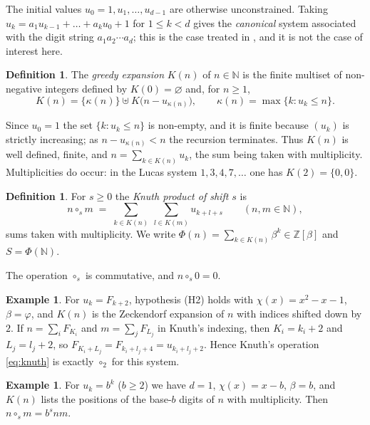 \documentclass[11pt,reqno]{amsart}
\theoremstyle{plain}
\theoremstyle{definition}
\newtheorem{definition}[theorem]{Definition}
\newtheorem{example}[theorem]{Example}
\newcommand{\Z}{\mathbb{Z}}
\newcommand{\N}{\mathbb{N}}
\begin{document}
The initial values $u_{0}=1,u_{1},\dots,u_{d-1}$ are otherwise unconstrained. Taking
$u_{k}=a_{1}u_{k-1}+\dots+a_{k}u_{0}+1$ for $1\le k<d$ gives the \emph{canonical} system associated
with the digit string $a_{1}a_{2}\cdots a_{d}$; this is the case treated in
\cite{Grabner,Messaoudi1,Messaoudi2,AFMP}, and it is not the case of interest here.

\begin{definition}\label{def:greedy}
The \emph{greedy expansion} $K(n)$ of $n\in\N$ is the finite multiset of non-negative integers
defined by $K(0)=\varnothing$ and, for $n\ge1$,
\[
  K(n)=\{\kappa(n)\}\uplus K\bigl(n-u_{\kappa(n)}\bigr),
  \qquad \kappa(n)=\max\{k:u_{k}\le n\}.
\]
\end{definition}

Since $u_{0}=1$ the set $\{k:u_{k}\le n\}$ is non-empty, and it is finite because $(u_{k})$ is
strictly increasing; as $n-u_{\kappa(n)}<n$ the recursion terminates. Thus $K(n)$ is well defined,
finite, and $n=\sum_{k\in K(n)}u_{k}$, the sum being taken with multiplicity. Multiplicities do
occur: in the Lucas system $1,3,4,7,\dots$ one has $K(2)=\{0,0\}$.

\begin{definition}\label{def:product}
For $s\ge0$ the \emph{Knuth product of shift $s$} is
\[
  n\circ_{s}m \;=\; \sum_{k\in K(n)}\ \sum_{l\in K(m)}u_{k+l+s}
  \qquad (n,m\in\N),
\]
sums taken with multiplicity. We write $\Phi(n)=\sum_{k\in K(n)}\beta^{k}\in\Z[\beta]$ and
$S=\Phi(\N)$.
\end{definition}

The operation $\circ_{s}$ is commutative, and $n\circ_{s}0=0$.

\begin{example}\label{ex:knuth}
For $u_{k}=F_{k+2}$, hypothesis (H2) holds with $\chi(x)=x^{2}-x-1$, $\beta=\varphi$, and $K(n)$ is
the Zeckendorf expansion of $n$ with indices shifted down by $2$. If $n=\sum_{i}F_{K_{i}}$ and
$m=\sum_{j}F_{L_{j}}$ in Knuth's indexing, then $K_{i}=k_{i}+2$ and $L_{j}=l_{j}+2$, so
$F_{K_{i}+L_{j}}=F_{k_{i}+l_{j}+4}=u_{k_{i}+l_{j}+2}$. Hence Knuth's operation \eqref{eq:knuth} is
exactly $\circ_{2}$ for this system.
\end{example}

\begin{example}\label{ex:base}
For $u_{k}=b^{k}$ ($b\ge2$) we have $d=1$, $\chi(x)=x-b$, $\beta=b$, and $K(n)$ lists the positions
of the base-$b$ digits of $n$ with multiplicity. Then $n\circ_{s}m=b^{s}nm$.
\end{example}
\end{document}

